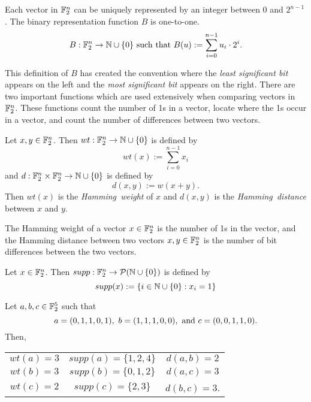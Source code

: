 \par Each vector in $\mathbb{F}_2^n$ can be uniquely represented by an integer
between $0$ and $2^{n-1}$. The binary representation function $B$
is one-to-one.
\begin{equation}
	B:\mathbb{F}_2^n\rightarrow\mathbb{N}\cup\{0\}\ \allowbreak
  {\rm such\ that }\ \allowbreak B(u) := \sum_{i=0}^{n-1}u_i\cdot2^i.
\end{equation}

\par This definition of $B$ has created the convention where the
{\em least significant bit} appears on the left and the 
{\em most significant bit} appears on the right. There are two important
functions which are used extensively when comparing vectors in $\mathbb{F}_2^n$.
These functions count the number of 1s in a vector, locate where the 1s
occur in a vector, and count the number of differences between two vectors.

\begin{definition}
\label{def:Hamming}
	Let $x,y\in\mathbb{F}_2^n$. Then $wt:\mathbb{F}_2^n\rightarrow\mathbb{N}\cup\{0\}$
  is defined by
	\[
	  wt(x):=\sum_{i=0}^{n-1}x_i
	\]
	and $d:\mathbb{F}_2^n\times\mathbb{F}_2^n\rightarrow\mathbb{N}\cup\{0\}$ is defined by
	\[
	  d(x,y):=w(x+y).
	\]
	Then $wt(x)$ is the {\em Hamming\ weight} of $x$ and $d(x,y)$ is the
	{\em Hamming\ distance} between $x$ and $y$.
\end{definition}

\begin{remark}
	The Hamming weight of a vector $x\in\mathbb{F}_2^n$ is the number of 1s in the
  vector, and the Hamming distance between two vectors $x,y\in\mathbb{F}_2^n$ is
  the number of bit differences between the two vectors.
\end{remark}

\begin{definition}
\label{def:support}
	Let $x\in\mathbb{F}_2^n$. Then $supp:\mathbb{F}_2^n\rightarrow\allowbreak
  \mathcal{P}(\mathbb{N}\cup\{0\})$ is defined by
	\[
		supp(x):=\{i\in\mathbb{N}\cup\{0\}:x_i=1\}
	\]
\end{definition}

\begin{example}
	Let $a,b,c\in\mathbb{F}_2^5$ such that
	\[
	a=(0,1,1,0,1),\ b=(1,1,1,0,0),\ {\rm and}\ c=(0,0,1,1,0).
	\]
	Then,
	\begin{center}
		\begin{tabular}{c c c}
			$wt(a)=3$&$supp(a)=\{1,2,4\}$&$d(a,b)=2$\\
			$wt(b)=3$&$supp(b)=\{0,1,2\}$&$d(a,c)=3$\\
			$wt(c)=2$&$ supp(c)=\{2,3\}$ &$d(b,c)=3$.\\
		\end{tabular}
	\end{center}
\end{example}

